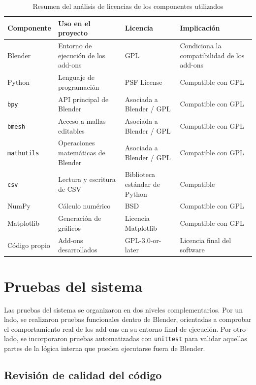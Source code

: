 \begin{table}[H]
\centering
\small
\caption{Resumen del análisis de licencias de los componentes utilizados}
\label{tab:analisis_licencias}
\begin{tabularx}{\textwidth}{|X|X|X|X|}
\hline
\textbf{Componente} & \textbf{Uso en el proyecto} & \textbf{Licencia} & \textbf{Implicación} \\
\hline
Blender & Entorno de ejecución de los add-ons & GPL & Condiciona la compatibilidad de los add-ons \\
\hline
Python & Lenguaje de programación & PSF License & Compatible con GPL \\
\hline
\texttt{bpy} & API principal de Blender & Asociada a Blender / GPL & Compatible con GPL \\
\hline
\texttt{bmesh} & Acceso a mallas editables & Asociada a Blender / GPL & Compatible con GPL \\
\hline
\texttt{mathutils} & Operaciones matemáticas de Blender & Asociada a Blender / GPL & Compatible con GPL \\
\hline
\texttt{csv} & Lectura y escritura de CSV & Biblioteca estándar de Python & Compatible \\
\hline
NumPy & Cálculo numérico & BSD & Compatible con GPL \\
\hline
Matplotlib & Generación de gráficos & Licencia Matplotlib & Compatible con GPL \\
\hline
Código propio & Add-ons desarrollados & GPL-3.0-or-later & Licencia final del software \\
\hline
\end{tabularx}
\end{table}

\section{Pruebas del sistema}
\label{sec:d-pruebas}

Las pruebas del sistema se organizaron en dos niveles complementarios. Por un lado, se realizaron pruebas funcionales dentro de Blender, orientadas a comprobar el comportamiento real de los add-ons en su entorno final de ejecución. Por otro lado, se incorporaron pruebas automatizadas con \texttt{unittest} para validar aquellas partes de la lógica interna que pueden ejecutarse fuera de Blender.

\subsection{Revisión de calidad del código}
\label{subsec:d-revisión-calidad-código}

